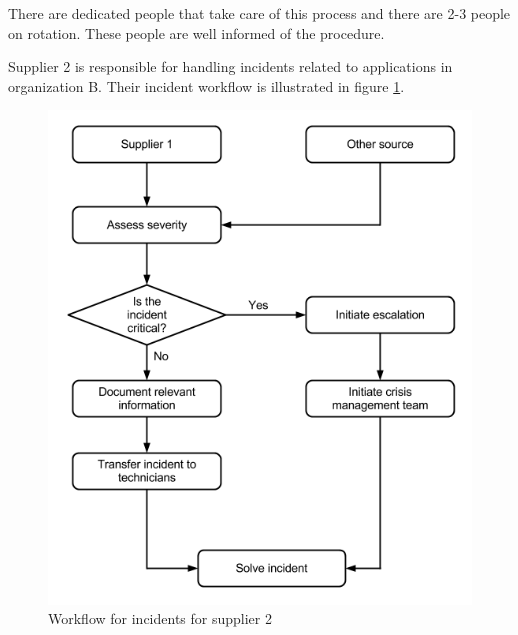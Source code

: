 There are dedicated people that take care of this process and there are 2-3 people on rotation. These people are well informed of the procedure.  


Supplier 2 is responsible for handling incidents related to applications in organization B. Their incident workflow is illustrated in figure \ref{fig:WorkflowCaseBSupplier2}.

\begin{figure}[H]
\begin{center}
\includegraphics[scale=0.54]{WorkflowCaseBSupplier2.png}
\caption[Workflow for incidents, Case B Supplier 2]{Workflow for incidents for supplier 2}
\label{fig:WorkflowCaseBSupplier2}
\end{center}
\end{figure}

